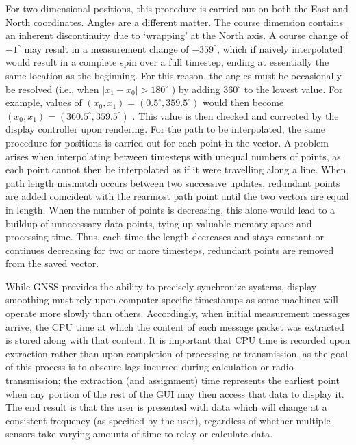 For two dimensional positions, this procedure is carried out on both the East and North coordinates. 
Angles are a different matter. The course dimension contains an inherent discontinuity due to `wrapping' at the North axis. A course change of $-1^\circ$ may result in a measurement change of $-359^\circ$, which if naively interpolated would result in a complete spin over a full timestep, ending at essentially the same location as the beginning. For this reason, the angles must be occasionally be resolved (i.e., when $|x_1 - x_0| > 180^\circ$ ) by adding $360^\circ$ to the lowest value. For example, values of $(x_0, x_1) = (0.5^\circ, 359.5^\circ)$ would then become $(x_0, x_1) = (360.5^\circ, 359.5^\circ)$ .  This value is then checked and corrected by the display controller upon rendering.
For the path to be interpolated,  the same procedure for positions is carried out for each point in the vector. A problem arises when interpolating between timesteps with unequal numbers of points, as each point cannot then be interpolated as if it were travelling along a line. When path length mismatch occurs between two successive updates, redundant points are added coincident with the rearmost path point until the two vectors are equal in length. When the number of points is decreasing, this alone would lead to a buildup of unnecessary data points, tying up valuable memory space and processing time. Thus, each time the length decreases and stays constant or continues decreasing for two or more timesteps, redundant points are removed from the saved vector.

While GNSS provides the ability to precisely synchronize systems, display smoothing must rely upon computer-specific timestamps as some machines will operate more slowly than others. Accordingly, when initial measurement messages arrive, the CPU time at which the content of each message packet was extracted is stored along with that content. It is important that CPU time is recorded upon extraction rather than upon completion of processing or transmission, as the goal of this process is to obscure lags incurred during calculation or radio transmission; the extraction (and assignment) time represents the earliest point when any portion of the rest of the GUI may then access that data to display it. The end result is that the user is presented with data which will change at a consistent frequency (as specified by the user), regardless of whether multiple sensors take varying amounts of time to relay or calculate data.

